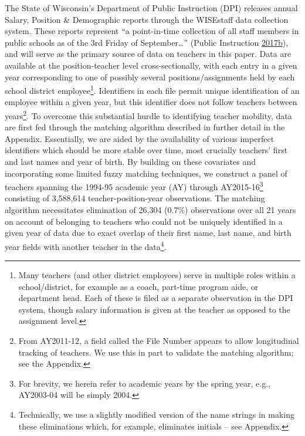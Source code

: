 \documentclass[12pt,]{article}
\let\rmarkdownfootnote\footnote%
\def\footnote{\protect\rmarkdownfootnote}
\begin{document}
The State of Wisconsin's Department of Public Instruction (DPI) releases
annual Salary, Position \& Demographic reports through the WISEstaff
data collection system. These reports represent ``a point-in-time
collection of all staff members in public schools as of the 3rd Friday
of September\ldots{}'' (Public Instruction
\protect\hyperlink{ref-dpi}{2017}\protect\hyperlink{ref-dpi}{b}), and
will serve as the primary source of data on teachers in this paper. Data
are available at the position-teacher level cross-sectionally, with each
entry in a given year corresponding to one of possibly several
positions/assignments held by each school district employee\footnote{Many
  teachers (and other district employees) serve in multiple roles within
  a school/district, for example as a coach, part-time program aide, or
  department head. Each of these is filed as a separate observation in
  the DPI system, though salary information is given at the teacher as
  opposed to the assignment level.}. Identifiers in each file permit
unique identification of an employee within a given year, but this
identifier does not follow teachers between years\footnote{From
  AY2011-12, a field called the File Number appears to allow
  longitudinal tracking of teachers. We use this in part to validate the
  matching algorithm; see the Appendix.}. To overcome this substantial
hurdle to identifying teacher mobility, data are first fed through the
matching algorithm described in further detail in the Appendix.
Essentially, we are aided by the availability of various imperfect
identifiers which should be more stable over time, most crucially
teachers' first and last names and year of birth. By building on these
covariates and incorporating some limited fuzzy matching techniques, we
construct a panel of teachers spanning the 1994-95 academic year (AY)
through AY2015-16\footnote{For brevity, we herein refer to academic
  years by the spring year, e.g., AY2003-04 will be simply 2004.}
consisting of 3,588,614 teacher-position-year observations. The matching
algorithm necessitates elimination of 26,304 (0.7\%) observations over
all 21 years on account of belonging to teachers who could not be
uniquely identified in a given year of data due to exact overlap of
their first name, last name, and birth year fields with another teacher
in the data\footnote{Technically, we use a slightly modified version of
  the name strings in making these eliminations which, for example,
  eliminates initials -- see Appendix.}.
\end{document}
